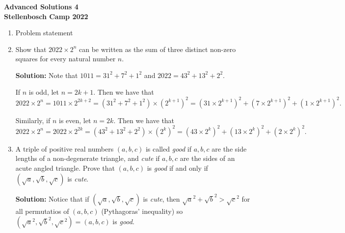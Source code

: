 \documentclass{article}
\begin{document}
\thispagestyle{empty}

\begin{center}
  \textbf{\Large Advanced Solutions 4}
  \\ \vspace{1em}
  \textbf{\large Stellenbosch Camp 2022}
  \\ \vspace{1em}
\end{center}

\bigskip \bigskip

\begin{enumerate}[itemsep=\fill]

\item %
Problem statement


\item %
Show that $2022 \times 2^n$ can be written as the sum of three distinct non-zero squares for every natural number $n$.

\textbf{Solution:}
Note that $1011 = 31^2 + 7^2 + 1^2$ and $2022 = 43^2 + 13^2 + 2^2$.

If $n$ is odd, let $n = 2k + 1$. Then we have that
\[
    2022 \times 2^n = 1011 \times 2^{2k + 2} = \left( 31^2 + 7^2 + 1^2 \right) \times {\left( 2^{k + 1} \right)}^2 = {\left( 31 \times 2^{k + 1} \right)}^2 + {\left( 7 \times 2^{k + 1} \right)}^2 + {\left( 1 \times 2^{k + 1} \right)}^2.
\]

Similarly, if $n$ is even, let $n = 2k$. Then we have that
\[
    2022 \times 2^n = 2022 \times 2^{2k} = \left( 43^2 + 13^2 + 2^2 \right) \times {\left( 2^{k} \right)}^2 = {\left( 43 \times 2^{k} \right)}^2 + {\left( 13 \times 2^{k} \right)}^2 + {\left( 2 \times 2^{k} \right)}^2.
\]


\item %
A triple of positive real numbers $(a,b,c)$ is called \textit{good} if $a,b,c$ are the side lengths of a non-degenerate triangle, and \textit{cute} if $a,b,c$ are the sides of an acute angled triangle. Prove that $(a,b,c)$ is \textit{good} if and only if $(\sqrt{a},\sqrt{b},\sqrt{c})$ is \textit{cute}. 

\textbf{Solution:}
Notice that if $(\sqrt{a},\sqrt{b},\sqrt{c})$ is \textit{cute}, then $\sqrt{a}^2 + \sqrt{b}^2 > \sqrt{c}^2$ for all permutatios of $(a,b,c)$ (Pythagoras' inequality) so $(\sqrt{a}^2,\sqrt{b}^2,\sqrt{c}^2)=(a,b,c)$ is \textit{good}.


\end{enumerate}
\end{document}
